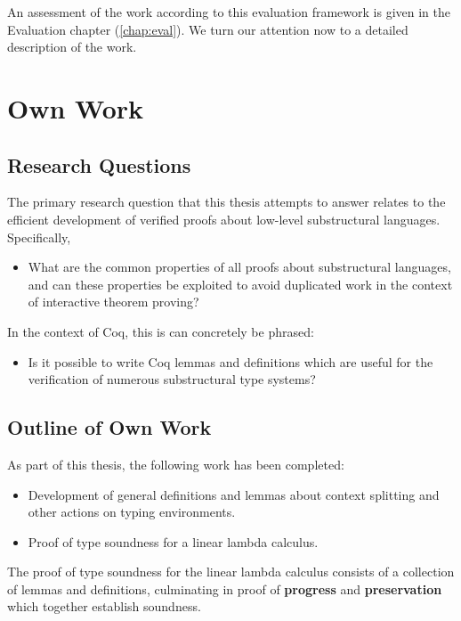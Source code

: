 \documentclass[]{unswthesis}
\let\b\textbf
\begin{document}
An assessment of the work according to this evaluation framework is given in the Evaluation chapter (\cref{chap:eval}). We turn our attention now to a detailed description of the work.

\chapter{Own Work}

\section{Research Questions}

The primary research question that this thesis attempts to answer relates to the efficient development of verified proofs about low-level substructural languages. Specifically,

\begin{itemize}
\item What are the common properties of all proofs about substructural languages, and can these properties be exploited to avoid duplicated work in the context of interactive theorem proving?
\end{itemize}

In the context of Coq, this is can concretely be phrased:

\begin{itemize}
\item Is it possible to write Coq lemmas and definitions which are useful for the verification of numerous substructural type systems?
\end{itemize}


\section{Outline of Own Work}

As part of this thesis, the following work has been completed:

\begin{itemize}
\item Development of general definitions and lemmas about context splitting and other actions on typing environments.
\item Proof of type soundness for a linear lambda calculus.
\end{itemize}

The proof of type soundness for the linear lambda calculus consists of a collection of lemmas and definitions, culminating in proof of \b{progress} and \b{preservation} which together establish soundness.
\end{document}
